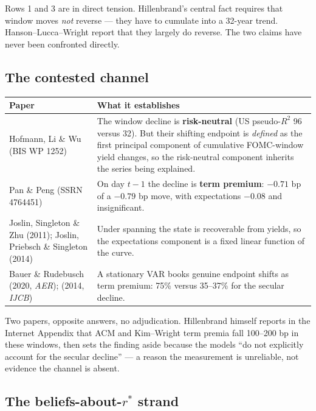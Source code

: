 \documentclass[11pt]{article}
\newcommand{\rs}{$r^{*}$}
\begin{document}
\vspace{0.5em}
\noindent Rows 1 and 3 are in direct tension. Hillenbrand's central fact requires that window
moves \emph{not} reverse --- they have to cumulate into a 32-year trend. Hanson--Lucca--Wright
report that they largely do reverse. The two claims have never been confronted directly.

\subsection{The contested channel}

\noindent
\begin{tabular}{@{}p{}p{}@{}}
\toprule
\textbf{Paper} & \textbf{What it establishes}\\ \midrule
Hofmann, Li \& Wu (BIS WP 1252) & The window decline is \textbf{risk-neutral} (US pseudo-$R^2$
96 versus 32). But their shifting endpoint is \emph{defined} as the first principal component
of cumulative FOMC-window yield changes, so the risk-neutral component inherits the series
being explained.\\[0.35em]
Pan \& Peng (SSRN 4764451) & On day $t-1$ the decline is \textbf{term premium}: $-0.71$ bp of a
$-0.79$ bp move, with expectations $-0.08$ and insignificant.\\[0.35em]
Joslin, Singleton \& Zhu (2011); Joslin, Priebsch \& Singleton (2014) & Under spanning the
state is recoverable from yields, so the expectations component is a fixed linear function
of the curve.\\[0.35em]
Bauer \& Rudebusch (2020, \emph{AER}); (2014, \emph{IJCB}) & A stationary VAR books genuine
endpoint shifts as term premium: 75\% versus 35--37\% for the secular decline.\\
\bottomrule
\end{tabular}

\vspace{0.5em}
\noindent Two papers, opposite answers, no adjudication. Hillenbrand himself reports in the
Internet Appendix that ACM and Kim--Wright term premia fall 100--200 bp in these windows,
then sets the finding aside because the models ``do not explicitly account for the secular
decline'' --- a reason the measurement is unreliable, not evidence the channel is absent.

\subsection{The beliefs-about-\rs{} strand}
\end{document}
